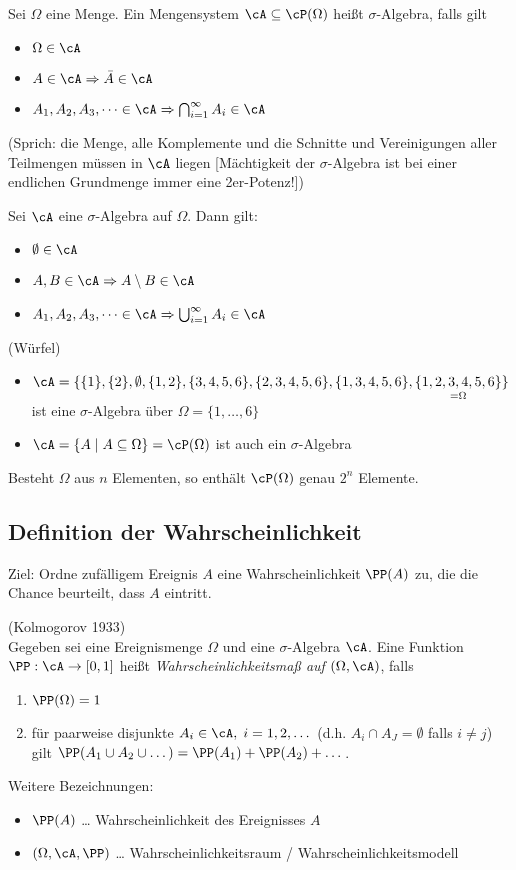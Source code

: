  Sei $\Omega$ eine Menge. Ein Mengensystem $\cA\subseteq \cP(\Omega)$ heißt $\sigma$-Algebra, falls gilt
\begin{itemize}
\item $\Omega \in \cA$
\item $A \in \cA \Rightarrow \bar A \in \cA$
\item $A_1, A_2, A_3, \dots \in \cA \Rightarrow \bigcap_{i=1}^\infty A_i \in \cA$
\end{itemize}
(Sprich: die Menge, alle Komplemente und die Schnitte und Vereinigungen aller Teilmengen müssen in $\cA$ liegen [Mächtigkeit der $\sigma$-Algebra ist bei einer endlichen Grundmenge immer eine 2er-Potenz!])

 Sei $\cA$ eine $\sigma$-Algebra auf $\Omega$. Dann gilt:
\begin{itemize}
\item $\emptyset \in \cA$
\item $A, B \in \cA \Rightarrow A \setminus B \in \cA$
\item $A_1, A_2,A_3,\dots \in \cA \Rightarrow \bigcup_{i=1}^\infty A_i \in \cA$
\end{itemize}

 (Würfel)
\begin{itemize}
\item $\cA=\{\{1\},\{2\},\emptyset, \{1,2\}, \{3,4,5,6\}, \{2,3,4,5,6\}, \{1,3,4,5,6\}, \underset{=\Omega}{\{1,2,3,4,5,6\} }\}$ ist eine $\sigma$-Algebra über $\Omega=\{1,\dots,6\}$
\item $\cA=\{A \;|\; A \subseteq \Omega\} = \cP(\Omega)$ ist auch ein $\sigma$-Algebra
\end{itemize}

 Besteht $\Omega$ aus $n$ Elementen, so enthält $\cP(\Omega)$ genau $2^n$ Elemente.

\subsection{Definition der Wahrscheinlichkeit}

Ziel: Ordne zufälligem Ereignis $A$ eine Wahrscheinlichkeit $\PP(A)$ zu, die die Chance beurteilt, dass $A$ eintritt.

 (Kolmogorov 1933)\\
Gegeben sei eine Ereignismenge $\Omega$ und eine $\sigma$-Algebra $\cA$. Eine Funktion $\PP : \cA \to [0,1]$ heißt \emph{Wahrscheinlichkeitsmaß auf $(\Omega,\cA)$}, falls
\begin{enumerate}
\item $\PP (\Omega) =1$
\item für paarweise disjunkte $A_i \in \cA, \; i=1,2,\dots$ (d.h. $A_i \cap A_J = \emptyset$ falls $i \not = j$) gilt $\PP(A_1 \cup A_2 \cup \dots ) = \PP(A_1)+\PP(A_2)+\dots$.
\end{enumerate}
Weitere Bezeichnungen:
\begin{itemize}
\item $\PP(A)$ … Wahrscheinlichkeit des Ereignisses $A$
\item $(\Omega,\cA, \PP)$ … Wahrscheinlichkeitsraum / Wahrscheinlichkeitsmodell
\end{itemize}

